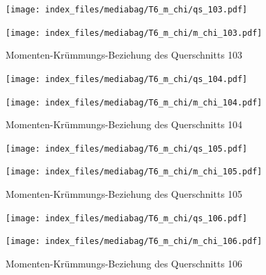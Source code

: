 \documentclass[
  11pt,
  letterpaper,
]{scrreprt}
\begin{document}
\begin{figure}[H]

\begin{minipage}{0.50\linewidth}
\texttt{[image: index\_files/mediabag/T6\_m\_chi/qs\_103.pdf]}\end{minipage}%
%
\begin{minipage}{0.50\linewidth}
\texttt{[image: index\_files/mediabag/T6\_m\_chi/m\_chi\_103.pdf]}\end{minipage}%

\caption{\label{fig-mchi_anhang}Momenten-Krümmungs-Beziehung des
Querschnitts 103}

\end{figure}%

\begin{figure}[H]

\begin{minipage}{0.50\linewidth}
\texttt{[image: index\_files/mediabag/T6\_m\_chi/qs\_104.pdf]}\end{minipage}%
%
\begin{minipage}{0.50\linewidth}
\texttt{[image: index\_files/mediabag/T6\_m\_chi/m\_chi\_104.pdf]}\end{minipage}%

\caption{\label{fig-mchi_anhang}Momenten-Krümmungs-Beziehung des
Querschnitts 104}

\end{figure}%

\begin{figure}[H]

\begin{minipage}{0.50\linewidth}
\texttt{[image: index\_files/mediabag/T6\_m\_chi/qs\_105.pdf]}\end{minipage}%
%
\begin{minipage}{0.50\linewidth}
\texttt{[image: index\_files/mediabag/T6\_m\_chi/m\_chi\_105.pdf]}\end{minipage}%

\caption{\label{fig-mchi_anhang}Momenten-Krümmungs-Beziehung des
Querschnitts 105}

\end{figure}%

\begin{figure}[H]

\begin{minipage}{0.50\linewidth}
\texttt{[image: index\_files/mediabag/T6\_m\_chi/qs\_106.pdf]}\end{minipage}%
%
\begin{minipage}{0.50\linewidth}
\texttt{[image: index\_files/mediabag/T6\_m\_chi/m\_chi\_106.pdf]}\end{minipage}%

\caption{\label{fig-mchi_anhang}Momenten-Krümmungs-Beziehung des
Querschnitts 106}

\end{figure}%
\end{document}

